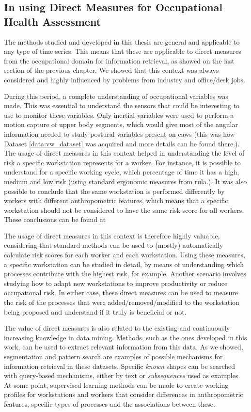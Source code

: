 \subsection{In using Direct Measures for Occupational Health Assessment}

The methods studied and developed in this thesis are general and applicable to any type of time series. This means that these are applicable to direct measures from the occupational domain for information retrieval, as showed on the last section of the previous chapter. We showed that this context was always considered and highly influenced by problems from industry and office/desk jobs. 
\par
During this period, a complete understanding of occupational variables was made. This was essential to understand the sensors that could be interesting to use to monitor these variables. Only inertial variables were used to perform a motion capture of upper body segments, which would give most of the angular information needed to study postural variables present on \gls{eaws} (this was how Dataset \ref{data:vw_dataset} was acquired and more details can be found there.). The usage of direct measures in this context helped in understanding the level of risk a specific workstation represents for a worker. For instance, it is possible to understand for a specific working cycle, which percentage of time it has a high, medium and low risk (using standard ergonomic measures from \gls{rula}.). It was also possible to conclude that the same workstation is performed differently by workers with different anthropometric features, which means that a specific workstation should not be considered to have the same risk score for all workers. These conclusions can be found at \cite{sara}
\par
The usage of direct measures in this context is therefore highly valuable, considering that standard methods can be used to (mostly) automatically calculate risk scores for each worker and each workstation. Using these measures, a specific workstation can be studied in detail, by means of understanding which processes contribute with the highest risk, for example. Another scenario involves studying how to adapt new workstations to improve productivity or reduce occupational risk. In either case, these direct measures can be used to measure the risk of the processes that were added/removed/modified to the workstation being proposed and understand if it truly is beneficial or not.
\par
The value of direct measures is also related to the existing and continuously increasing knowledge in data mining. Methods, such as the ones developed in this work, can be used to extract relevant information from this data. As we showed, segmentation and pattern search are examples of possible mechanisms for information retrieval in these datasets. Specific \textit{known} shapes can be searched with query-based mechanisms, either by text or \textit{subsequences} used as examples. At some point, supervised learning methods can be made to create working profiles for workstations and workers that consider differences in anthropometric features, specific types of processes and the associations between these. 
